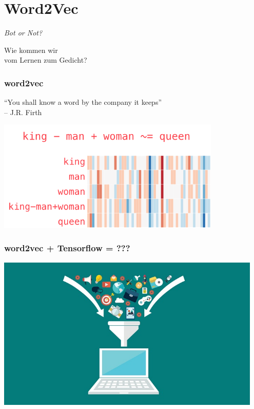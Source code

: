 \documentclass[aspectratio=43,x11names]{beamer}
\begin{document}

\section{Word2Vec}

\begin{frame}
\begin{center}
\huge
\emph{Bot or Not?}
\bigskip

\Large
Wie kommen wir\\ vom Lernen zum Gedicht?
\end{center}
\end{frame}

\begin{frame}
\frametitle{word2vec}
\begin{center}
``You shall know a word by the company it keeps''\\
\qquad\qquad\qquad\qquad -- J.R. Firth
\bigskip\bigskip

\includegraphics[width=0.8\textwidth]{images/word2vec} 
\end{center}
\end{frame}

\begin{frame}
\frametitle{word2vec + Tensorflow = ???}
\begin{center}
\includegraphics[width=0.95\textwidth]{images/funnel} 
\end{center}
\end{frame}
\end{document}
